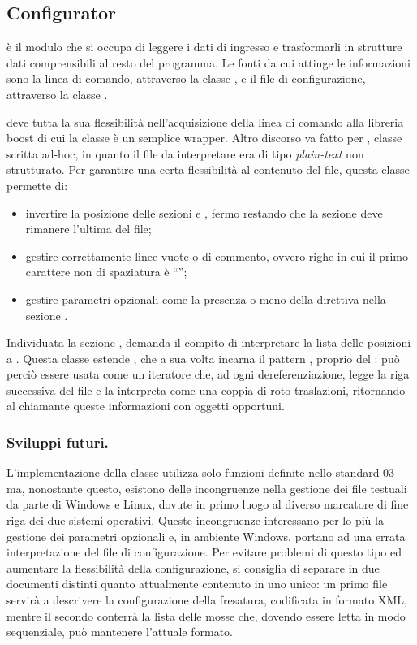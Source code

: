 \subsection{Configurator}
 è il modulo che si occupa di leggere i dati di ingresso e trasformarli in strutture dati comprensibili al resto del programma. Le fonti da cui attinge le informazioni sono la linea di comando, attraverso la classe , e il file di configurazione, attraverso la classe .

 deve tutta la sua flessibilità nell'acquisizione della linea di comando alla libreria boost  di cui la classe è un semplice wrapper. Altro discorso va fatto per , classe scritta ad-hoc, in quanto il file da interpretare era di tipo \emph{plain-text} non strutturato. Per garantire una certa flessibilità al contenuto del file, questa classe permette di:
\begin{itemize}
	\item invertire la posizione delle sezioni \code{[PRODUCT]} e \code{[TOOL]}, fermo restando che la sezione \code{[POINTS]} deve rimanere l'ultima del file;
	\item gestire correttamente linee vuote o di commento, ovvero righe in cui il primo carattere non di spaziatura è ``\code{#}'';
	\item gestire parametri opzionali come la presenza o meno della direttiva  nella sezione \code{[TOOL]}.
\end{itemize}
Individuata la sezione \code{[POINTS]},  demanda il compito di interpretare la lista delle posizioni a . Questa classe estende , che a sua volta incarna il pattern , proprio del \cpp: può perciò essere usata come un iteratore che, ad ogni dereferenziazione, legge la riga successiva del file e la interpreta come una coppia di roto-traslazioni, ritornando al chiamante queste informazioni con oggetti opportuni.

\subsubsection{Sviluppi futuri.}
L'implementazione della classe  utilizza solo funzioni definite nello standard \cpp{}03 ma, nonostante questo, esistono delle incongruenze nella gestione dei file testuali da parte di Windows e Linux, dovute in primo luogo al diverso marcatore di fine riga dei due sistemi operativi. Queste incongruenze interessano per lo più la gestione dei parametri opzionali e, in ambiente Windows, portano ad una errata interpretazione del file di configurazione. Per evitare problemi di questo tipo ed aumentare la flessibilità della configurazione, si consiglia di separare in due documenti distinti quanto attualmente contenuto in uno unico: un primo file servirà a descrivere la configurazione della fresatura, codificata in formato XML, mentre il secondo conterrà la lista delle mosse che, dovendo essere letta in modo sequenziale, può mantenere l'attuale formato.

